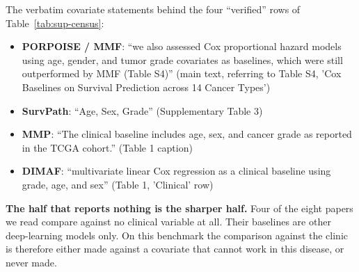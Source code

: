 \documentclass[11pt]{article}
\begin{document}
\noindent The verbatim covariate statements behind the four ``verified'' rows of
Table~\ref{tab:sup-census}:
\begin{itemize}
  \item \textbf{PORPOISE / MMF}: ``we also assessed Cox proportional hazard models using age, gender, and tumor grade covariates as baselines, which were still outperformed by MMF (Table S4)'' (main text, referring to Table S4, 'Cox Baselines on Survival Prediction across 14 Cancer Types')
  \item \textbf{SurvPath}: ``Age, Sex, Grade'' (Supplementary Table 3)
  \item \textbf{MMP}: ``The clinical baseline includes age, sex, and cancer grade as reported in the TCGA cohort.'' (Table 1 caption)
  \item \textbf{DIMAF}: ``multivariate linear Cox regression as a clinical baseline using grade, age, and sex'' (Table 1, 'Clinical' row)
\end{itemize}

\noindent \textbf{The half that reports nothing is the sharper half.} Four of the eight papers we
read compare against no clinical variable at all. Their baselines are other deep-learning models
only. On this benchmark the comparison against the clinic is therefore either made against a
covariate that cannot work in this disease, or never made.
\end{document}
